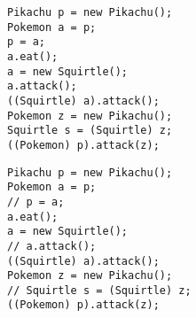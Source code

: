 \ifprintanswers\else
\begin{lstlisting}
Pikachu p = new Pikachu();
Pokemon a = p;
p = a;
a.eat();
a = new Squirtle();
a.attack();
((Squirtle) a).attack();
Pokemon z = new Pikachu();
Squirtle s = (Squirtle) z;
((Pokemon) p).attack(z);
\end{lstlisting}
\fi

\begin{solution}
\begin{lstlisting}
Pikachu p = new Pikachu();
Pokemon a = p;
// p = a;
a.eat();
a = new Squirtle();
// a.attack();
((Squirtle) a).attack();
Pokemon z = new Pikachu();
// Squirtle s = (Squirtle) z;
((Pokemon) p).attack(z);
\end{lstlisting}
\end{solution}